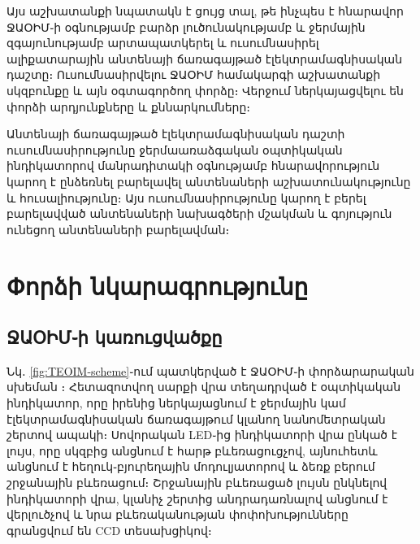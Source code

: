 \documentclass[12pt, fleqn]{report}
\begin{document}
Այս աշխատանքի նպատակն է ցույց տալ, թե ինչպես է հնարավոր ՋԱՕԻՄ֊ի օգնությամբ բարձր լուծունակությամբ և ջերմային զգայունությամբ արտապատկերել և ուսումնասիրել ալիքատարային անտենայի ճառագայթած էլեկտրամագնիսական դաշտը։ Ուսումնասիրվելու ՋԱՕԻՄ համակարգի աշխատանքի սկզբունքը և այն օգտագործող փորձը։ Վերջում ներկայացվելու են փորձի արդյունքները և քննարկումները։

Անտենայի ճառագայթած էլեկտրամագնիսական դաշտի ուսումնասիրությունը ջերմաառաձգական օպտիկական ինդիկատորով մանրադիտակի օգնությամբ հնարավորություն կարող է ընձեռնել բարելավել անտենաների աշխատունակությունը և հուսալիությունը։ Այս ուսումնասիրությունը կարող է բերել բարելավված անտենաների նախագծերի մշակման և գոյություն ունեցող անտենաների բարելավման։

\newpage

\renewcommand{\thesection}{\arabic{section}}

\section{Փորձի նկարագրությունը}
\subsection{ՋԱՕԻՄ֊ի կառուցվածքը}

Նկ․ \ref{fig:TEOIM-scheme}֊ում պատկերված է ՋԱՕԻՄ֊ի փորձարարական սխեման \cite{arakelyan2016teoim}։ Հետազոտվող սարքի վրա տեղադրված է օպտիկական ինդիկատոր, որը իրենից ներկայացնում է ջերմային կամ էլեկտրամագնիսական ճառագայթում կլանող նանոմետրական շերտով ապակի։ Սովորական LED֊ից ինդիկատորի վրա ընկած է լույս, որը սկզբից անցնում է հարթ բևեռացուցչով, այնուհետև անցնում է հեղուկ֊բյուրեղային մոդուլյատորով և ձեռք բերում շրջանային բևեռացում։ Շրջանային բևեռացած լույսն ընկնելով ինդիկատորի վրա, կլանիչ շերտից անդրադառնալով անցնում է վերլուծչով և նրա բևեռականության փոփոխությունները գրանցվում են CCD տեսախցիկով։
\end{document}
